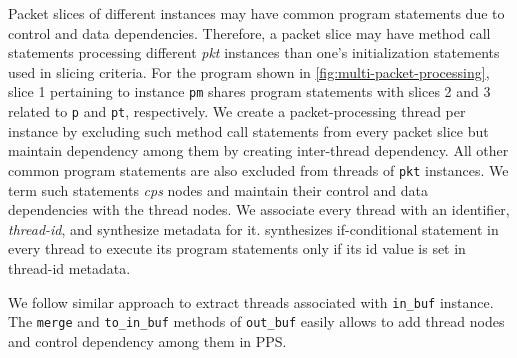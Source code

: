 \documentclass[letterpaper,twocolumn,10pt]{article}
\begin{document}
Packet slices of different instances may have common program 
statements due to control and data dependencies. Therefore, a packet 
slice may have method call statements processing different \emph{pkt} 
instances than one's initialization statements used in slicing 
criteria. For the program shown in \cref{fig:multi-packet-processing}, 
slice 1 pertaining to instance \texttt{pm} shares program statements 
with slices 2 and 3 related to \texttt{p} and \texttt{pt}, 
respectively.
We create a packet-processing thread per instance by excluding such 
method call statements from every packet slice but maintain dependency 
among them by creating inter-thread dependency.
All other common program statements are also excluded from threads of 
\texttt{pkt} instances. We term such statements \emph{cps} nodes and 
maintain their control and data dependencies with the thread nodes.
We associate every thread with an identifier, \emph{thread-id}, and 
synthesize metadata for it. \ucomp synthesizes if-conditional 
statement in every thread to execute its program statements only if 
its id value is set in thread-id metadata.




We follow similar approach to extract threads associated with \texttt{in\_buf} instance.
The \texttt{merge} and \texttt{to\_in\_buf} methods of \texttt{out\_buf} easily allows to add thread nodes and control dependency among them in PPS.
\end{document}

